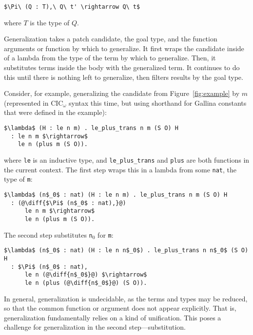 \begin{lstlisting}[language=coq]
  $\Pi\ (Q : T),\ Q\ t' \rightarrow Q\ t$
\end{lstlisting}
where $T$ is the type of $Q$.

Generalization takes a patch candidate, the goal type, and the function arguments or function by which to generalize.
It first wraps the candidate inside of a lambda from the type of the term by which to generalize.
Then, it substitutes terms inside the body with the generalized term.
It continues to do this until there is nothing left to generalize, then filters results by the goal type.

Consider, for example, generalizing the candidate from Figure~\ref{fig:example} by $m$ (represented in CIC$_{\omega}$ syntax this time,
but using shorthand for Gallina constants that were defined in the example): %

\begin{lstlisting}[language=coq]
  $\lambda$ (H : le n m) . le_plus_trans n m (S O) H
  : le n m $\rightarrow$
    le n (plus m (S O)).
\end{lstlisting}
where \lstinline{le} is an inductive type, and \lstinline{le_plus_trans} and \lstinline{plus} are both functions in the current context.
The first step wraps this in a lambda from some \lstinline{nat}, the type of \lstinline{m}:

\begin{lstlisting}[language=coq]
  $\lambda$ (n$_0$ : nat) (H : le n m) . le_plus_trans n m (S O) H
  : (@\diff{$\Pi$ (n$_0$ : nat),}@)
      le n m $\rightarrow$
      le n (plus m (S O)).
\end{lstlisting}
The second step substitutes \lstinline{n}$_0$ for \lstinline{m}:

\begin{lstlisting}[language=coq]
  $\lambda$ (n$_0$ : nat) (H : le n n$_0$) . le_plus_trans n n$_0$ (S O) H
  : $\Pi$ (n$_0$ : nat),
      le n (@\diff{n$_0$}@) $\rightarrow$
      le n (plus (@\diff{n$_0$}@) (S O)).
\end{lstlisting}

In general, generalization is %
undecidable,
as the terms and types may be reduced,
so that the common function or argument does not appear explicitly.
That is, generalization fundamentally relies on a kind of unification.
This poses a challenge for generalization in the second step---substitution.

